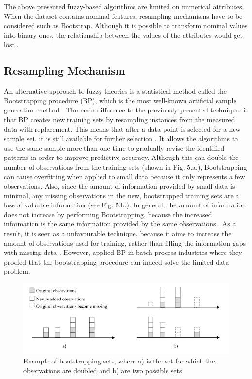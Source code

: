 \documentclass[parskip=full]{scrartcl}
\begin{document}
The above presented fuzzy-based algorithms are limited on numerical attributes. When the dataset contains nominal features, resampling mechanisms have to be considered such as Bootstrap. Although it is possible to transform nominal values into binary ones, the relationship between the values of the attributes would get lost \cite{Tsai.2008}. 

\subsection{Resampling Mechanism}

An alternative approach to fuzzy theories is a statistical method called the 
Bootstrapping procedure (BP), which is the most well-known artificial sample 
generation method \cite{AbdulLateh.2017}. The main difference to the previously 
presented techniques is that BP creates new training sets by resampling 
instances from the measured data with replacement. This means that after a data 
point is selected for a new sample set, it is still available for further 
selection \cite{Efron.1993}. It allows the algorithms to use the same sample 
more than one time to gradually revise the identified patterns in order to 
improve predictive accuracy. Although this can double the number of 
observations from the training sets (shown in Fig. 5.a.), Bootstrapping can 
cause overfitting when applied to small data because it only represents a few 
observations. Also, since the amount of information provided by small data is 
minimal, any missing observations in the new, bootstrapped training sets are a 
loss of valuable information (see Fig. 5.b.). In general, the amount of 
information does not increase by performing Bootstrapping, because the 
increased information is the same information provided by the same observations 
\cite{Li.2018}. As a result, it is seen as a unfavourable technique, because it 
aims to increase the amount of observations used for training, rather than 
filling the information gaps with missing data \cite{Tsai.2015}. However, 
\cite{Ivanescu.2006} applied BP in batch process industries where they proofed 
that the bootstrapping procedure can indeed solve the limited data problem.

\begin{figure}[H]
	\centering
	\includegraphics[width=0.9\linewidth]{resources/bootstrapping_example}
	\caption{Example of bootstrapping sets, where a) is the set for which the 
	observations are doubled and b) are two possible sets}
	\label{fig:bootstrappingexample}
\end{figure}
\end{document}
